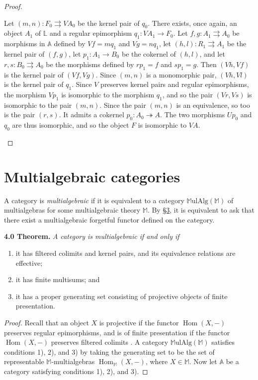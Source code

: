 \documentclass{article}
\newenvironment{itenv}[1]
  {\phantomsection\par\medskip\noindent\textbf{#1.}\itshape}
  {\medskip}
\newcommand{\bb}[1]{{\mathbb{#1}}}
\newcommand{\MulAlg}{\mathbb{M}\mathrm{ulAlg}}
\DeclareMathOperator{\Hom}{Hom}
\begin{document}
\begin{proof}
\begin{enumerate}[a)]
      Let $(m,n)\colon F_0\rightrightarrows VA_0$ be the kernel pair of $q_0$.
      There exists, once again, an object $A_1$ of $\bb{L}$ and a regular epimorphism $q_1\colon VA_1\to F_0$.
      Let $f,g\colon A_1\rightrightarrows A_0$ be morphisms in $\bb{A}$ defined by $Vf=mq_1$ and $Vg=nq_1$, let $(h,l)\colon R_1\rightrightarrows A_1$ be the kernel pair of $(f,g)$, let $p_1\colon A_1\to B_0$ be the cokernel of $(h,l)$, and let $r,s\colon B_0\rightrightarrows A_0$ be the morphisms defined by $rp_1=f$ and $sp_1=g$.
      Then $(Vh,Vf)$ is the kernel pair of $(Vf,Vg)$.
      Since $(m,n)$ is a monomorphic pair, $(Vh,Vl)$ is the kernel pair of $q_1$.
      Since $V$ preserves kernel pairs and regular epimorphisms, the morphism $Vp_1$ is isomorphic to the morphism $q_1$, and so the pair $(Vr,Vs)$ is isomorphic to the pair $(m,n)$.
      Since the pair $(m,n)$ is an equivalence, so too is the pair $(r,s)$.
      It admits a cokernel $p_0\colon A_0\twoheadrightarrow A$.
      The two morphisms $Up_0$ and $q_0$ are thus isomorphic, and so the object $F$ is isomorphic to $VA$.
  \end{enumerate}
\end{proof}



\section{Multialgebraic categories}
\label{4}

A category is \emph{multialgebraic} if it is equivalent to a category $\MulAlg(\bb{M})$ of multialgebras for some multialgebraic theory $\bb{M}$.
By \hyperref[3]{\S3}, it is equivalent to ask that there exist a multialgebraic forgetful functor defined on the category.

\begin{itenv}{4.0 Theorem}
\label{4.0}
  A category is multialgebraic if and only if
  \begin{enumerate}[1)]
    \item it has filtered colimits and kernel pairs, and its equivalence relations are effective;
    \item it has finite multisums; and
    \item it has a proper generating set consisting of projective objects of finite presentation.
  \end{enumerate}
\end{itenv}

\begin{proof}
  Recall that an object $X$ is projective if the functor $\Hom(X,-)$ preserves regular epimorphisms, and is of finite presentation if the functor $\Hom(X,-)$ preserves filtered colimits \cite{5}.
  A category $\MulAlg(\bb{M})$ satisfies conditions 1), 2), and 3) by taking the generating set to be the set of representable $\bb{M}$-multialgebras $\Hom_\bb{M}(X,-)$, where $X\in\bb{M}$.
  Now let $\bb{A}$ be a category satisfying conditions 1), 2), and 3).
\end{proof}
\end{document}
